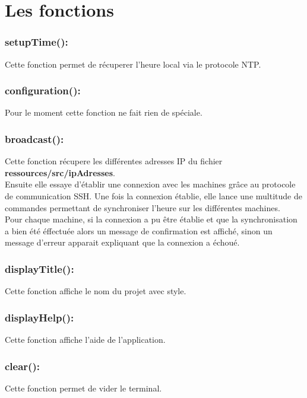 \documentclass[a4paper,11pt]{report}
\begin{document}
\section{Les fonctions}
  \subsubsection{\textbf{setupTime()}:}
  \hspace{0.5cm}
  Cette fonction permet de récuperer l'heure local via le protocole NTP.
  
  \subsubsection{\textbf{configuration()}:}
  \hspace{0.5cm}
  Pour le moment cette fonction ne fait rien de spéciale.
  
  \subsubsection{\textbf{broadcast()}:}
  \hspace{0.5cm}
  Cette fonction récupere les différentes adresses IP du fichier \textbf{ressources/src/ipAdresses}.\\
  Ensuite elle essaye d'établir une connexion avec les machines grâce au protocole de communication SSH. Une fois la connexion établie, elle lance une multitude de commandes permettant de synchroniser l'heure sur les différentes machines.\\
  Pour chaque machine, si la connexion a pu être établie et que la synchronisation a bien été éffectuée alors un message de confirmation est affiché, sinon un message d'erreur apparait expliquant que la connexion a échoué.
  
  \subsubsection{\textbf{displayTitle()}:}
  \hspace{0.5cm}
  Cette fonction affiche le nom du projet avec style.
  
  \subsubsection{\textbf{displayHelp()}:}
  \hspace{0.5cm}
  Cette fonction affiche l'aide de l'application.
  
  \subsubsection{\textbf{clear()}:}
  \hspace{0.5cm}
  Cette fonction permet de vider le terminal.
  
\end{document}
